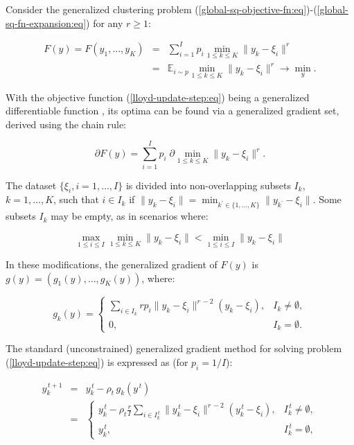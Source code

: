 Consider the generalized clustering problem (\ref{global-sq-objective-fn:eq})-(\ref{global-sq-fn-expansion:eq}) for any $r\geq 1$:

\begin{eqnarray}
    \label{lloyd-update-step:eq}
    F(y) = F(y_1, \ldots, y_K) &=& \sum_{i=1}^I p_i \min_{1 \leq k \leq K} \| y_k - \xi_i \|^r \nonumber \\
    &=& \mathbb{E}_{i \sim p} \min_{1 \leq k \leq K} \| y_k - \xi_i \|^r \rightarrow \min_y.
\end{eqnarray}

With the objective function (\ref{lloyd-update-step:eq}) being a generalized differentiable function \cite{Norkin_1986}, its optima can be found via a generalized gradient set, derived using the chain rule:

\begin{equation}
    \label{lloyd-grad-set:eq}
    \partial F(y) = \sum_{i=1}^I p_i \; \partial \min_{1 \leq k \leq K} \| y_k - \xi_i \|^r. 
\end{equation}

The dataset $\{ \xi_i, i = 1, \ldots, I \}$ is divided into non-overlapping subsets $I_k$, $k = 1, \ldots, K$, such that $i \in I_k$ if $\| y_k - \xi_i \| = \min_{k^\prime \in \{ 1, \ldots, K \}} \| y_{k^\prime} - \xi_i \|$. Some subsets $I_k$ may be empty, as in scenarios where:

\begin{equation}
    \label{lloyd-empty-set-cond:eq}
    \max_{1 \leq i \leq I} \min_{1 \leq k \leq K} \|y_k - \xi_i\| < \min_{1 \leq i \leq I} \|y_k - \xi_i\|
\end{equation}

In these modifications, the generalized gradient of $F(y)$ is $g(y) = (g_1(y), \ldots, g_K(y))$, where:

\begin{equation}
    \label{lloyd-gen-grad-component:eq}
    g_k(y) = \begin{cases}
        \sum_{i \in I_k} r p_i \|y_{k} - \xi_i\|^{r\,-2}(y_{k} - \xi_i), & I_k \neq \emptyset, \\
        0, & I_k = \emptyset. 
    \end{cases}
\end{equation}

The standard (unconstrained) generalized gradient method for solving problem (\ref{lloyd-update-step:eq}) is expressed as (for $p_i = 1/I$):

\begin{eqnarray}
    \label{lloyd-gen-grad:eq}
    y_k^{\,t+1} &=& y_k^{\,t} - \rho_t \,g_k(y^{\,t}) \nonumber \\
                &=& \begin{cases}
                    y_k^{\,t} - \rho_t \frac{r}{I} \sum_{i \in I_k^{\,t}} \|y_k^{\,t} - \xi_i\|^{r\,-2}(y_k^{\,t} - \xi_i), & I_k^{\,t} \neq \emptyset, \\
                    y_k^{\,t}, & I_k^{\,t} = \emptyset,
                \end{cases}
\end{eqnarray}

